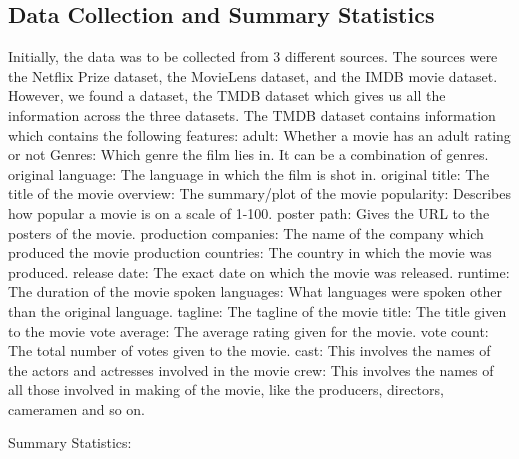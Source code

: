 \documentclass{article}
\begin{document}
\subsection{Data Collection and Summary Statistics}
Initially, the data was to be collected from 3 different sources. The sources were the Netflix Prize dataset, the MovieLens dataset, and the IMDB movie dataset. However, we found a dataset, the TMDB dataset which gives us all the information across the three datasets. The TMDB dataset contains information which contains the following features:
adult: Whether a movie has an adult rating or not
Genres: Which genre the film lies in. It can be a combination of genres.
original language: The language in which the film is shot in.
original title: The title of the movie
overview: The summary/plot of the movie
popularity: Describes how popular a movie is on a scale of 1-100.
poster path: Gives the URL to the posters of the movie.	
production companies: The name of the company which produced the movie
production countries: The country in which the movie was produced.
release date: The exact date on which the movie was released.
runtime: The duration of the movie
spoken languages: What languages were spoken other than the original language.
tagline: The tagline of the movie
title: The title given to the movie
vote average: The average rating given for the movie.
vote count: The total number of votes given to the movie.
cast: This involves the names of the actors and actresses involved in the movie
crew: This involves the names of all those involved in making of the movie, like the producers, directors, cameramen and so on.

Summary Statistics:
\end{document}
